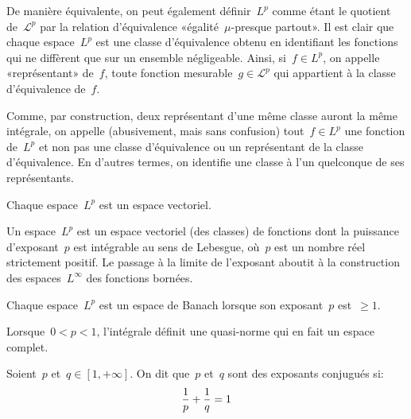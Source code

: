De manière équivalente, on peut également définir~$L^p$ comme étant le quotient de~$\mathcal{L}^p$ par la relation d'équivalence «égalité~$\mu$-presque partout».
\medskipvm
Il est clair que chaque espace~$L^p$ est une classe d'équivalence obtenu en identifiant les fonctions qui ne diffèrent que sur un ensemble négligeable. Ainsi, si~$f\in L^p$, on appelle «représentant» de~$f$, toute fonction mesurable~$g\in\mathcal{L}^p$ qui appartient à la classe d'équivalence de~$f$.

Comme, par construction, deux représentant d'une même classe auront la même intégrale, on
appelle (abusivement, mais sans confusion) tout~$f\in L^p$ une fonction de~$L^p$ et non pas une classe d'équivalence ou un représentant de la classe d'équivalence.
En d'autres termes, on identifie une classe à l'un quelconque de ses représentants.

\medskip
{}

\begin{theoreme}
Chaque espace~$L^p$ est un espace vectoriel.
\end{theoreme}

Un espace~$L^p$ est un espace vectoriel (des classes) de fonctions dont la puissance d'exposant~$p$ est
intégrable au sens de Lebesgue, où~$p$ est un nombre réel strictement positif.
Le passage à la limite de l'exposant aboutit à la construction des espaces~$L^\infty$ des fonctions
bornées.

\medskip
\begin{theoreme}
Chaque espace~$L^p$ est un espace de Banach lorsque son exposant~$p$ est~$\ge 1$.
\end{theoreme}

\begin{theoreme}
Lorsque~$0 < p < 1$, l'intégrale définit une quasi-norme qui en fait un espace complet.
\end{theoreme}


\medskip
\begin{definition}
Soient~$p$ et~$q\in [1,+\infty]$. On dit que~$p$ et~$q$ sont des exposants conjugués si:
\begin{equation}\colorred\dfrac1p + \dfrac1q = 1 \end{equation}
\end{definition}

